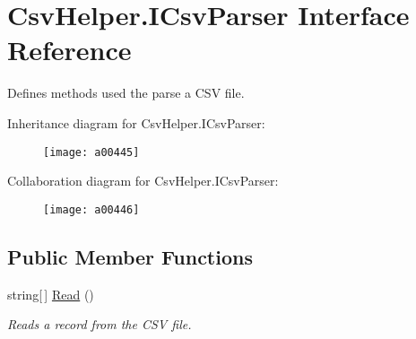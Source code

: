 \hypertarget{a00107}{\section{Csv\-Helper.\-I\-Csv\-Parser Interface Reference}
\label{a00107}
}


Defines methods used the parse a C\-S\-V file.  




Inheritance diagram for Csv\-Helper.\-I\-Csv\-Parser\-:
\nopagebreak
\begin{figure}[H]
\begin{center}
\leavevmode
\texttt{[image: a00445]}
\end{center}
\end{figure}


Collaboration diagram for Csv\-Helper.\-I\-Csv\-Parser\-:
\nopagebreak
\begin{figure}[H]
\begin{center}
\leavevmode
\texttt{[image: a00446]}
\end{center}
\end{figure}
\subsection*{Public Member Functions}
\begin{DoxyCompactItemize}
\item 
string\mbox{[}$\,$\mbox{]} \hyperlink{a00107_a411461b4cd33dce0b42c81715359f687}{Read} ()
\begin{DoxyCompactList}\small\item\em Reads a record from the C\-S\-V file. \end{DoxyCompactList}\end{DoxyCompactItemize}
